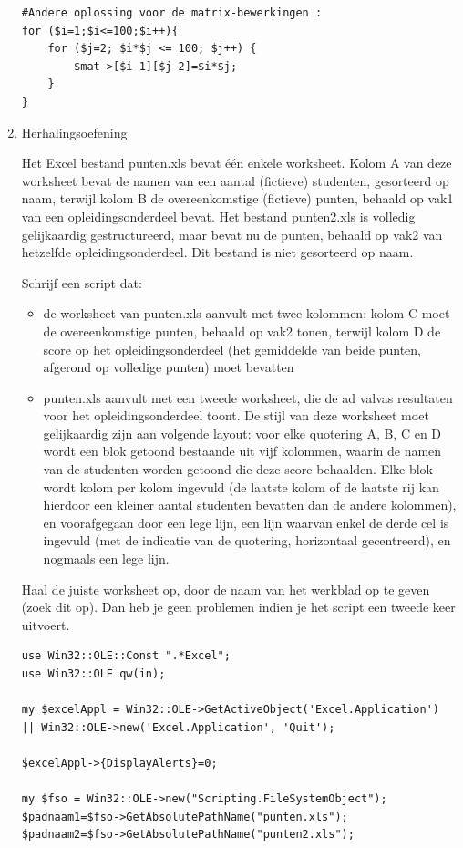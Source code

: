 \documentclass[11pt,a4paper]{report}
\begin{document}
\begin{enumerate}[resume]
\begin{lstlisting}
#Andere oplossing voor de matrix-bewerkingen :
for ($i=1;$i<=100;$i++){
	for ($j=2; $i*$j <= 100; $j++) {
		$mat->[$i-1][$j-2]=$i*$j;
	}
}
\end{lstlisting}
	\item Herhalingsoefening
	\par Het Excel bestand punten.xls bevat één enkele worksheet. Kolom A van deze worksheet bevat de namen van een aantal (fictieve) studenten, gesorteerd op naam, terwijl kolom B de overeenkomstige (fictieve) punten, behaald op vak1 van een opleidingsonderdeel bevat. Het bestand punten2.xls is volledig gelijkaardig gestructureerd, maar bevat nu de punten, behaald op vak2 van hetzelfde opleidingsonderdeel. Dit bestand is niet gesorteerd op naam. 
	\par Schrijf een script dat:
	\begin{itemize}
		\item de worksheet van punten.xls aanvult met twee kolommen: kolom C moet de overeenkomstige punten, behaald op vak2 tonen, terwijl kolom D de score op het opleidingsonderdeel (het gemiddelde van beide punten, afgerond op volledige punten) moet bevatten
		\item punten.xls aanvult met een tweede worksheet, die de ad valvas resultaten voor het opleidingsonderdeel toont. De stijl van deze worksheet moet gelijkaardig zijn aan volgende layout: voor elke quotering A, B, C en D wordt een blok getoond bestaande uit vijf kolommen, waarin de namen van de studenten worden getoond die deze score behaalden. Elke blok wordt kolom per kolom ingevuld (de laatste kolom of de laatste rij kan hierdoor een kleiner aantal studenten bevatten dan de andere kolommen), en voorafgegaan door een lege lijn, een lijn waarvan enkel de derde cel is ingevuld (met de indicatie van de quotering, horizontaal gecentreerd), en nogmaals een lege lijn.
	\end{itemize}	
	Haal de juiste worksheet op, door de naam van het werkblad op te geven (zoek dit op). Dan heb je geen problemen indien je het script een tweede keer uitvoert.
\begin{lstlisting}
use Win32::OLE::Const ".*Excel";
use Win32::OLE qw(in);

my $excelAppl = Win32::OLE->GetActiveObject('Excel.Application')
|| Win32::OLE->new('Excel.Application', 'Quit');

$excelAppl->{DisplayAlerts}=0;

my $fso = Win32::OLE->new("Scripting.FileSystemObject");
$padnaam1=$fso->GetAbsolutePathName("punten.xls");
$padnaam2=$fso->GetAbsolutePathName("punten2.xls");


\end{lstlisting}
\end{enumerate}
\end{document}
